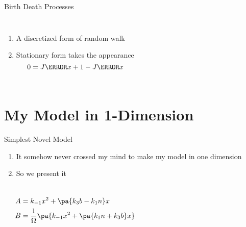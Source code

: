 \documentclass[aspectratio=169,  notheorems, sOuRcEs]{RUCPresentation}
\newcounter{reaction}
\begin{document}
\begin{frame}{ Birth Death Processes }

    \begin{columns}%

        \column{0.5\framewidth}

        \begin{enumerate}
            \item A discretized form of random walk
            \item Stationary form takes the appearance
                \begin{equation}
                    0 = J\of{x+1} - J\of x
                \end{equation}
        \end{enumerate}

        \column{0.5\framewidth}

    \end{columns}


\end{frame}



\section{My Model in 1-Dimension}
\begin{frame}{Simplest Novel Model}

    \begin{enumerate}
        \item It somehow never crossed my mind to make my model in one dimension
        \item So we present it
    \end{enumerate}

    \begin{columns}%

        \column{0.5\framewidth}

        \begin{reactiontable}
        \end{reactiontable}


        \begin{align*}
            A &= k_{-1} x^2 + \pa{ k_3 b - k_1 n } x
            \\
            B &= {1 \over \Omega} \pa{k_{-1} x^2 + \pa{ k_1 n + k_3 b } x}
        \end{align*}

    \end{columns}



\end{frame}
\end{document}
